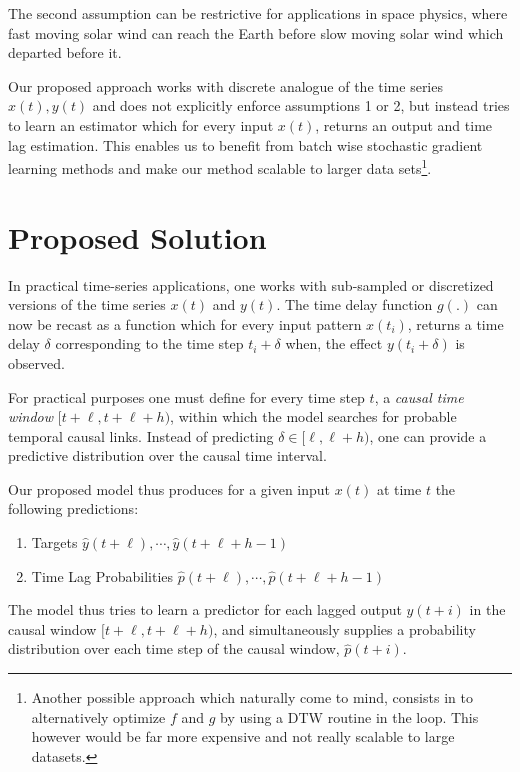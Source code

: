 \documentclass[twoside]{article}
\begin{document}
The second assumption can be restrictive for applications in space physics, where fast moving solar wind can reach the Earth before slow moving solar wind which departed before it. 

Our proposed approach works with discrete analogue of the time series $x(t), y(t)$ and does not explicitly enforce assumptions 1 or 2, but instead tries to learn an estimator which for every input $x(t)$, returns an output and time lag estimation. This enables us to benefit from batch wise stochastic gradient learning methods and make our method scalable to larger data sets\footnote{
Another possible approach which naturally come to mind, consists in to alternatively optimize $f$ and $g$ by using a DTW routine in the loop. This however would be far more expensive and not really scalable to large datasets.}.

\section{Proposed Solution}\label{sec:model}

In practical time-series applications, one works with sub-sampled or discretized versions of the time 
series $x(t)$ and $y(t)$. The time delay function $g(.)$ can now be recast as a function which for every
input pattern $x(t_i)$, returns a time delay $\delta$ corresponding to the time step $t_i + \delta$ when,
the effect $y(t_i + \delta)$ is observed.

For practical purposes one must define for every time step $t$, a \emph{causal time window} $[t+\ell, t+\ell+h)$, within which the model searches for probable temporal causal links. Instead of predicting $\delta \in [\ell, \ell+h)$, one can provide a predictive distribution over the causal time interval.

Our proposed model thus produces for a given input $x(t)$ at time $t$ the following predictions:

\begin{enumerate}
\item Targets $\hat{y}(t+\ell), \cdots, \hat{y}(t+\ell+h-1)$
\item Time Lag Probabilities $\hat{p}(t+\ell), \cdots, \hat{p}(t+\ell+h-1)$
\end{enumerate}

The model thus tries to learn a predictor for each lagged output $y(t+i)$ in the causal window $[t+\ell, t+\ell+h)$, and simultaneously supplies a probability distribution over each time step of the causal window, $\hat{p}(t+i)$.
\end{document}
